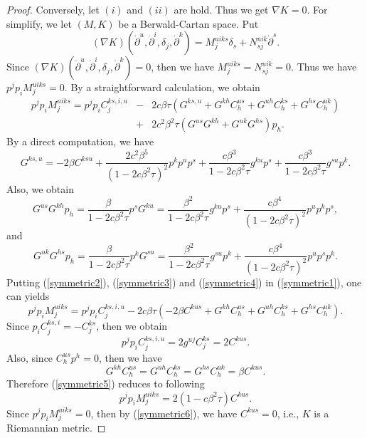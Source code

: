 \documentclass[10pt,a4paper]{article}
\theoremstyle{plain}
\theoremstyle{definition}
\begin{document}
\begin{proof}
Conversely, let $(i)$ and $(ii)$ are hold. Thus we get $\nabla K=0$. For simplify, we let $(M,K)$ be a Berwald-Cartan
space. Put
\[
(\nabla
K)({\dot{\partial}}^u,{\dot{\partial}}^i,\delta_j,{\dot{\partial}}^k)=M^{uiks}_j\delta_s+N^{uik}_{sj}{\dot{\partial}}^s.
\]
Since $(\nabla
K)({\dot{\partial}}^u,{\dot{\partial}}^i,\delta_j,{\dot{\partial}}^k)=0$,
then we have $M^{uiks}_j=N^{uik}_{sj}=0$. Thus we have
$p^jp_iM^{uiks}_j=0$. By a straightforward calculation,  we obtain
\begin{eqnarray}
p^jp_iM^{uiks}_j=p^jp_iC^{ks,i,u}_j\!\!\!\!&-&\!\!\!\!2c\beta\tau(G^{ks,u}+G^{kh}C^{us}_h+G^{uh}C^{ks}_h+G^{hs}C^{uk}_h)\nonumber\\
\!\!\!\!&+&\!\!\!\! 2c^2\beta^2\tau(G^{us}G^{kh}+G^{uk}G^{hs})p_h.\label{symmetric1}
\end{eqnarray}
By a direct computation, we have
\begin{equation}
G^{ks,u}=-2\beta
C^{ksu}+\frac{2c^2\beta^5}{(1-2c\beta^2\tau)^2}p^kp^up^s+\frac{c\beta^3}{1-2c\beta^2\tau}g^{ku}p^s+\frac{c\beta^3}{1-2c\beta^2\tau}g^{su}p^k.\label{symmetric2}
\end{equation}
Also, we obtain
\begin{equation}
G^{us}G^{kh}p_h=\frac{\beta}{1-2c\beta^2\tau}p^sG^{ku}=\frac{\beta^2}{1-2c\beta^2\tau}g^{ku}p^s+\frac{c\beta^4}{(1-2c\beta^2\tau)^2}p^up^kp^s,\label{symmetric3}
\end{equation}
and
\begin{equation}
G^{uk}G^{hs}p_h=\frac{\beta}{1-2c\beta^2\tau}p^kG^{su}=\frac{\beta^2}{1-2c\beta^2\tau}g^{su}p^k+\frac{c\beta^4}{(1-2c\beta^2\tau)^2}p^up^sp^k.\label{symmetric4}
\end{equation}
Putting (\ref{symmetric2}), (\ref{symmetric3}) and
(\ref{symmetric4}) in (\ref{symmetric1}), one can yields
\begin{equation}
p^jp_iM^{uiks}_j=p^jp_iC^{ks,i,u}_j-2c\beta\tau(-2\beta
C^{kus}+G^{kh}C^{us}_h+G^{uh}C^{ks}_h+G^{hs}C^{uk}_h).\label{symmetric5}
\end{equation}
Since $p_iC^{ks,i}_j=-C^{ks}_j$, then we obtain
\[
p^jp_iC^{ks,i,u}_j=2g^{uj}C^{ks}_j=2C^{kus}.
\]
Also, since
$C^{us}_hp^h=0$, then we have
\[
G^{kh}C^{us}_h=G^{uh}C^{ks}_h=G^{hs}C^{uk}_h=\beta C^{kus}.
\]
Therefore (\ref{symmetric5}) reduces to following
\begin{equation}
p^jp_iM^{uiks}_j=2(1-c\beta^2\tau)C^{kus}.\label{symmetric6}
\end{equation}
Since $p^jp_iM^{uiks}_j=0$, then by (\ref{symmetric6}), we have
$C^{kus}=0$, i.e., $K$  is a Riemannian metric.
\end{proof}
\end{document}
